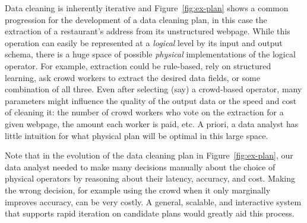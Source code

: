 Data cleaning is inherently iterative and Figure~\ref{fig:ex-plan} shows a common progression for the development of a data cleaning plan, in this case the extraction of a restaurant's address from its unstructured webpage.
While this operation can easily be represented at a \textit{logical} level by its input and output schema, there is a huge space of possible \textit{physical} implementations of the logical operator. 
For example, extraction could be rule-based, rely on structured learning, ask crowd workers to extract the desired data fields, or some combination of all three.
Even after selecting (say) a crowd-based operator, many parameters might influence the quality of the output data or the speed and cost of cleaning it: the number of crowd workers who vote on the extraction for a given webpage, the amount each worker is paid, etc.
A priori, a data analyst has little intuition for what physical plan will be optimal in this large space.

Note that in the evolution of the data cleaning plan in Figure~\ref{fig:ex-plan}, our data analyst needed to make many decisions manually about the choice of physical operators by reasoning about their latency, accuracy, and cost. 
Making the wrong decision, for example using the crowd when it only marginally improves accuracy, can be very costly.
A general, scalable, and interactive system that supports rapid iteration on candidate plans would greatly aid this process.




